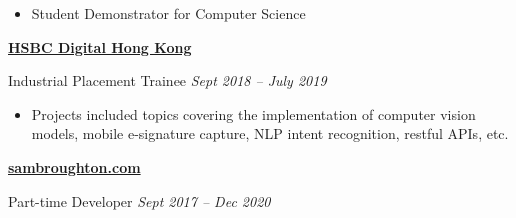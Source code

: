 \documentclass[10pt]{article} %
\begin{document}
\begin{changemargin}{0pt}{0.5pt}
\begin{minipage}[t]{0.5\textwidth}
\begin{changemargin}{1pt}{1pt}
\begin{itemize} \itemsep-2pt %
  \item Student Demonstrator for Computer Science 
\end{itemize}


\vspace{5pt}
\underline{\textbf{HSBC Digital Hong Kong}}\\
\par
\vspace{-10pt}
 Industrial Placement Trainee \textit{\hfill Sept 2018 -- July 2019} \\
\vspace{-15pt}

\begin{itemize} \itemsep-2pt %
  \item Projects included topics covering the implementation of computer vision models, mobile e-signature capture, NLP intent recognition, restful APIs, etc.
	
\end{itemize}


\vspace{5pt}
\underline{\textbf{sambroughton.com}}\\
\par
\vspace{-10pt}
Part-time Developer \textit{\hfill Sept 2017 -- Dec 2020}\\
\vspace{-15pt}


\end{changemargin}
\end{minipage}
\end{changemargin}
\end{document}
